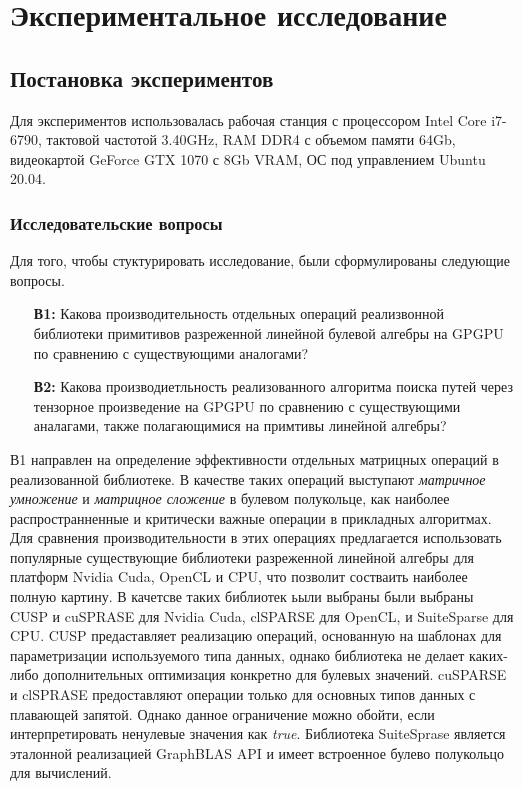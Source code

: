 \section{Экспериментальное исследование}

\subsection{Постановка экспериментов}

Для экспериментов использовалась рабочая станция с процессором Intel Core i7-6790, тактовой частотой 3.40GHz, RAM DDR4 с объемом памяти 64Gb, видеокартой GeForce GTX 1070 с 8Gb VRAM, ОС под управлением Ubuntu 20.04.

\subsubsection*{Исследовательские вопросы}

Для того, чтобы стуктурировать исследование, были сформулированы следующие вопросы.

\begin{itemize}
   \item[\textbf{В1:}] Какова производительность отдельных операций реализвонной библиотеки примитивов разреженной линейной булевой алгебры на GPGPU по сравнению с существующими аналогами?
   
   \item[\textbf{В2:}] Какова производиетльность реализованного алгоритма поиска путей через тензорное произведение на GPGPU  по сравнению с существующими аналагами, также полагающимися на примтивы линейной алгебры? 
\end{itemize}

В1 направлен на определение эффективности отдельных матрицных операций в реализованной библиотеке. В качестве таких операций выступают \textit{матричное умножение} и \textit{матрицное сложение} в булевом полукольце, как наиболее распространненные и критически важные операции в прикладных алгоритмах. Для сравнения производительности в этих операциях предлагается использовать популярные существующие библиотеки разреженной линейной алгебры для платформ Nvidia Cuda, OpenCL и CPU, что позволит состваить наиболее полную картину. В качетсве таких библиотек ьыли выбраны были выбраны CUSP и cuSPRASE для Nvidia Cuda, clSPARSE для OpenCL, и SuiteSparse для CPU. CUSP предаставляет реализацию операций, основанную на шаблонах для параметризации используемого типа данных, однако библиотека не делает каких-либо дополнительных оптимизация конкретно для булевых значений. cuSPARSE и clSPRASE предоставляют операции только для основных типов данных с плавающей запятой. Однако данное ограничение можно обойти, если интерпретировать ненулевые значения как \textit{true}. Библиотека SuiteSprase является эталонной реализацией GraphBLAS API и имеет встроенное булево полукольцо для вычислений.

